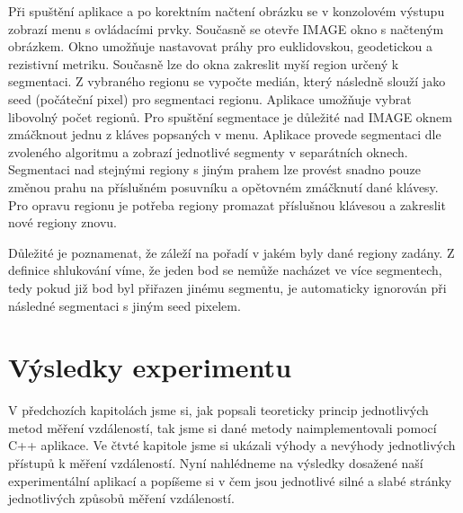 \documentclass[czech, master, public, dept460, male, cpdeclaration, oneside]{diploma}
\begin{document}
Při spuštění aplikace a po korektním načtení obrázku se v konzolovém výstupu zobrazí menu s ovládacími prvky. Současně se otevře IMAGE okno s načteným obrázkem. Okno umožňuje nastavovat práhy pro euklidovskou, geodetickou a rezistivní metriku. Současně lze do okna zakreslit myší region určený k segmentaci. Z vybraného regionu se vypočte medián, který následně slouží jako seed (počáteční pixel) pro segmentaci regionu. Aplikace umožňuje vybrat libovolný počet regionů. Pro spuštění segmentace je důležité nad IMAGE oknem zmáčknout jednu z kláves popsaných v menu. Aplikace provede segmentaci dle zvoleného algoritmu a zobrazí jednotlivé segmenty v separátních oknech. Segmentaci nad stejnými regiony s jiným prahem lze provést snadno pouze změnou prahu na příslušném posuvníku a opětovném zmáčknutí dané klávesy. Pro opravu regionu je potřeba regiony promazat příslušnou klávesou a zakreslit nové regiony znovu.\par
Důležité je poznamenat, že záleží na pořadí v jakém byly dané regiony zadány. Z definice shlukování víme, že jeden bod se nemůže nacházet ve více segmentech, tedy pokud již bod byl přiřazen jinému segmentu, je automaticky ignorován při následné segmentaci s jiným seed pixelem. 

\section{Výsledky experimentu}
V předchozích kapitolách jsme si, jak popsali teoreticky princip jednotlivých metod měření vzdáleností, tak jsme si dané metody naimplementovali pomocí C++ aplikace. Ve čtvté kapitole jsme si ukázali výhody a nevýhody jednotlivých přístupů k měření vzdáleností. Nyní nahlédneme na výsledky dosažené naší experimentální aplikací a popíšeme si v čem jsou jednotlivé silné a slabé stránky jednotlivých způsobů měření vzdáleností.
\end{document}
